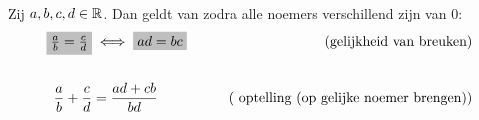\documentclass{ximera}
\begin{document}
\begin{proposition}\label{samenvatting:breuken} \ 
	
	Zij $a,b,c,d\in \mathbb{R}$. Dan geldt van zodra alle noemers verschillend zijn van $0$:
	\begin{align*}
		\important{\frac{a}{b} = \frac{c}{d}}  &\iff \important{ad = bc} 
        & \tag{\label{samenvatting: gelijkheid breuken}gelijkheid van breuken}\\ \\
\frac{a}{b}+\frac{c}{d} &= \frac{ad+cb}{bd} 
        & \tag{\label{samenvatting:optelling breuken} optelling (op gelijke noemer brengen)} \\ \\
	\end{align*}
\end{proposition}
\end{document}
